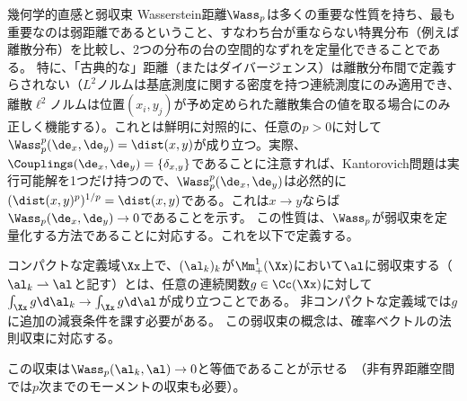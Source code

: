 \begin{rem2}{幾何学的直感と弱収束}
Wasserstein距離$\Wass_p$は多くの重要な性質を持ち、最も重要なのは弱距離であるということ、すなわち台が重ならない特異分布（例えば離散分布）を比較し、2つの分布の台の空間的なずれを定量化できることである。
%
特に、「古典的な」距離（またはダイバージェンス）は離散分布間で定義すらされない（$L^2$ノルムは基底測度に関する密度を持つ連続測度にのみ適用でき、離散$\ell^2$ノルムは位置$(x_i,y_j)$が予め定められた離散集合の値を取る場合にのみ正しく機能する）。これとは鮮明に対照的に、任意の$p> 0$に対して$\Wass_p^p(\de_x,\de_y) = \dist(x,y)$が成り立つ。実際、$\Couplings(\de_x,\de_y)=\{ \delta_{x,y}\}$であることに注意すれば、Kantorovich問題は実行可能解を1つだけ持つので、$\Wass_p^p(\de_x,\de_y)$は必然的に$(\dist(x,y)^p)^{1/p}=\dist(x,y)$である。これは$x \rightarrow y$ならば$\Wass_p(\de_x,\de_y) \rightarrow 0$であることを示す。
%
この性質は、$\Wass_p$が弱収束を定量化する方法であることに対応する。これを以下で定義する。

\begin{defn}[弱収束]\label{dfn-weak-conv}
	コンパクトな定義域$\Xx$上で、$(\al_k)_k$が$\Mm_+^1(\Xx)$において$\al$に弱収束する（$\al_k \rightharpoonup \al$と記す）とは、任意の連続関数$g \in \Cc(\Xx)$に対して$\int_\Xx g \d\al_k \rightarrow \int_\Xx g \d\al$が成り立つことである。
	非コンパクトな定義域では$g$に追加の減衰条件を課す必要がある。
	この弱収束の概念は、確率ベクトルの法則収束に対応する。
\end{defn}

この収束は$\Wass_p(\al_k,\al) \rightarrow 0$と等価であることが示せる~\citep[Theorem 6.8]{Villani09}（非有界距離空間では$p$次までのモーメントの収束も必要）。
\end{rem2}


